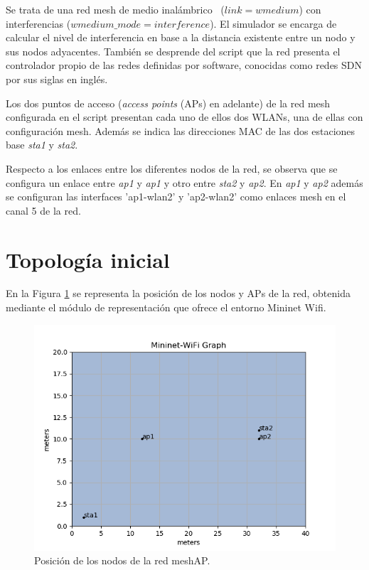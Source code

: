 \documentclass[a4paper,12pt,twoside,spanish]{book}
\begin{document}
Se trata de una red mesh de medio inalámbrico \
($link=wmedium$) con interferencias ($wmedium\_mode=interference$). El simulador se encarga de calcular el nivel de interferencia en base a la distancia existente entre un nodo y sus nodos adyacentes. También se desprende del script que la red presenta el controlador propio de las redes definidas por software, conocidas como redes SDN por sus siglas en inglés.\par

Los dos puntos de acceso (\textit{access points} (APs) en adelante) de la red mesh configurada en el script presentan cada uno de ellos dos WLANs, una de ellas con configuración mesh. Además se indica las direcciones MAC de las dos estaciones base \textit{sta1} y \textit{sta2}.\par

Respecto a los enlaces entre los diferentes nodos de la red, se observa que se configura un enlace entre \textit{ap1} y \textit{ap1} y otro entre \textit{sta2} y \textit{ap2}. En \textit{ap1} y \textit{ap2} además se configuran las interfaces 'ap1-wlan2' y 'ap2-wlan2' como enlaces mesh en el canal 5 de la red.\par

\section{Topología inicial}

En la Figura \ref{fig:pos} se representa la posición de los nodos y APs de la red, obtenida mediante el módulo de representación que ofrece el entorno Mininet Wifi.

	\begin{figure}[!h]
		\centering
		\includegraphics[scale=0.7]{Figuras/posicion.png}
		\caption{Posición de los nodos de la red meshAP.}
		\label{fig:pos}
	\end{figure}
\end{document}
